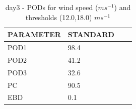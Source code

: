 \begin{table}[h!]
\begin{center}
\begin{tabular}{|l|l|l|l|}
\hline
\multicolumn{1}{|c|}{\cellcolor[HTML]{C0C0C0}\textbf{PARAMETER}} & \multicolumn{1}{c|}{\cellcolor[HTML]{C0C0C0}\textbf{STANDARD}} \\
\hline
\cellcolor[HTML]{C0C0C0}POD1  & 98.4   \\
\cellcolor[HTML]{C0C0C0}POD2  & 41.2   \\
\cellcolor[HTML]{C0C0C0}POD3  & 32.6   \\
\cellcolor[HTML]{C0C0C0}PC    & 90.5     \\
\cellcolor[HTML]{C0C0C0}EBD   & 0.1    \\
\hline
\end{tabular}
\caption{day3 - PODs for wind speed ($m s^{-1}$) and thresholds (12.0,18.0) $m s^{-1}$}
\label{tab:podwsFT:day3}
\end{center}
\end{table}
